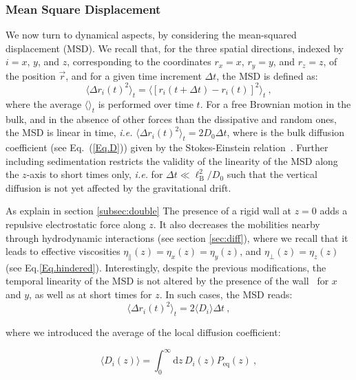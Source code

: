 \subsubsection{Mean Square Displacement}

We now turn to dynamical aspects, by considering the mean-squared displacement (MSD). We recall that, for the three spatial directions, indexed by $i=x$, $y$, and $z$, corresponding to the coordinates $r_x=x$, $r_y=y$, and $r_z=z$, of the position $\vec{r}$, and for a given time increment $\Delta t$, the MSD is defined as:
\begin{equation}
	\langle\Delta r_i(t)^2 \rangle_t = \langle[r_i(t+\Delta t) - r_i(t)]^2\rangle_t\ ,
	\label{MSDdef}
\end{equation}
where the average $\langle\rangle_t$ is performed over time $t$. For a free Brownian motion in the bulk, and in the absence of other forces than the dissipative and random ones, the \gls{MSD} is linear in time, \textit{i.e.} $\langle\Delta r_i(t)^2 \rangle_t = 2 D_0 \Delta t$, where is the bulk diffusion coefficient (see Eq.~(\ref{Eq.D})) given by the Stokes-Einstein relation~\cite{einstein_uber_1905}. Further including sedimentation restricts the validity of the linearity of the \gls{MSD} along the $z$-axis to short times only, \textit{i.e.} for $\Delta t\ll\ell_{\textrm{B}}^2/D_0$ such that the vertical diffusion is not yet affected by the gravitational drift.

As explain in section \ref{subsec:double} The presence of a rigid wall at $z=0$ adds a repulsive electrostatic force along $z$. It also decreases the mobilities nearby through hydrodynamic interactions (see section \ref{sec:diff}), where we recall that it leads to effective viscosities $\eta_\parallel(z)=\eta_x(z)=\eta_y(z)$, and $\eta_\bot(z) = \eta_z(z)$ (see Eq.\ref{Eq.hindered}). Interestingly, despite the previous modifications, the temporal linearity of the MSD is not altered by the presence of the wall~\cite{chubynsky_diffusing_2014,prieve_measurement_1999} for $x$ and $y$, as well as at short times for $z$. In such cases, the MSD reads:
\begin{equation}
	\langle\Delta r_i(t)^2 \rangle_t = 2 \langle D_i \rangle \Delta t\ ,
	\label{averagediff}
\end{equation}

where we introduced the average of the local diffusion coefficient:

\begin{equation}
	\langle D_i(z) \rangle = \int_0^{\infty} \textrm{d}z\, D_i(z)P_{\textrm{eq}}(z) ~,
\end{equation}  

